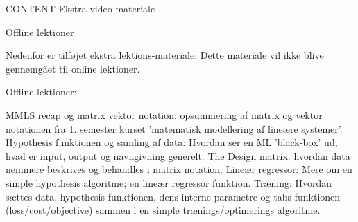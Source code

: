 
CONTENT Ekstra video materiale

Offline lektioner

Nedenfor er tilføjet ekstra lektions-materiale. Dette materiale vil ikke blive gennemgået til online lektioner.

Offline lektioner:

    MMLS recap og matrix vektor notation:
        opsummering af matrix og vektor notationen fra 1. semester kurset 'matematisk modellering af lineære systemer'.
    Hypothesis funktionen og samling af data:
        Hvordan ser en ML 'black-box' ud, hvad er input, output og navngivning generelt.
    The Design matrix:
        hvordan data nemmere beskrives og behandles i matrix notation.
    Lineær regressor:
        Mere om en simple hypothesis algoritme; en lineær regressor funktion.
    Træning:
        Hvordan sættes data, hypothesis funktionen, dens interne parametre og tabs-funktionen (loss/cost/objective) sammen i en simple trænings/optimerings algoritme.











